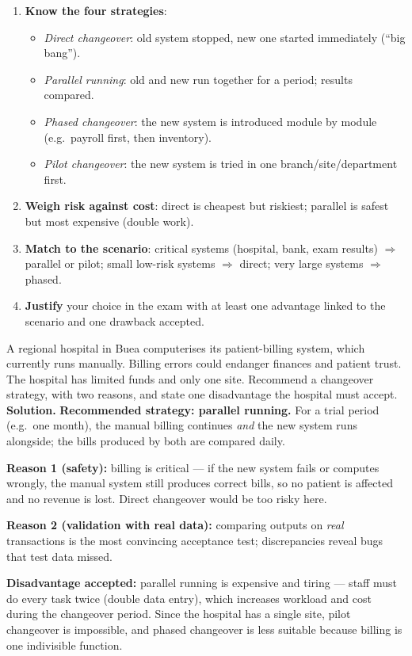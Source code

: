\documentclass[11pt]{article}
\begin{document}
\begin{methode}
\begin{enumerate}
\item \textbf{Know the four strategies}:
\begin{itemize}
\item \emph{Direct changeover}: old system stopped, new one started immediately (``big bang'').
\item \emph{Parallel running}: old and new run together for a period; results compared.
\item \emph{Phased changeover}: the new system is introduced module by module (e.g.\ payroll first, then inventory).
\item \emph{Pilot changeover}: the new system is tried in one branch/site/department first.
\end{itemize}
\item \textbf{Weigh risk against cost}: direct is cheapest but riskiest; parallel is safest but most expensive (double work).
\item \textbf{Match to the scenario}: critical systems (hospital, bank, exam results) $\Rightarrow$ parallel or pilot; small low-risk systems $\Rightarrow$ direct; very large systems $\Rightarrow$ phased.
\item \textbf{Justify} your choice in the exam with at least one advantage linked to the scenario and one drawback accepted.
\end{enumerate}
\end{methode}

\begin{exoresolu}
A regional hospital in Buea computerises its patient-billing system, which currently runs manually. Billing errors could endanger finances and patient trust. The hospital has limited funds and only one site. Recommend a changeover strategy, with two reasons, and state one disadvantage the hospital must accept.
\tcblower
\textbf{Solution.} \textbf{Recommended strategy: parallel running.} For a trial period (e.g.\ one month), the manual billing continues \emph{and} the new system runs alongside; the bills produced by both are compared daily.

\textbf{Reason 1 (safety):} billing is critical — if the new system fails or computes wrongly, the manual system still produces correct bills, so no patient is affected and no revenue is lost. Direct changeover would be too risky here.

\textbf{Reason 2 (validation with real data):} comparing outputs on \emph{real} transactions is the most convincing acceptance test; discrepancies reveal bugs that test data missed.

\textbf{Disadvantage accepted:} parallel running is expensive and tiring — staff must do every task twice (double data entry), which increases workload and cost during the changeover period. Since the hospital has a single site, pilot changeover is impossible, and phased changeover is less suitable because billing is one indivisible function.
\end{exoresolu}
\end{document}
